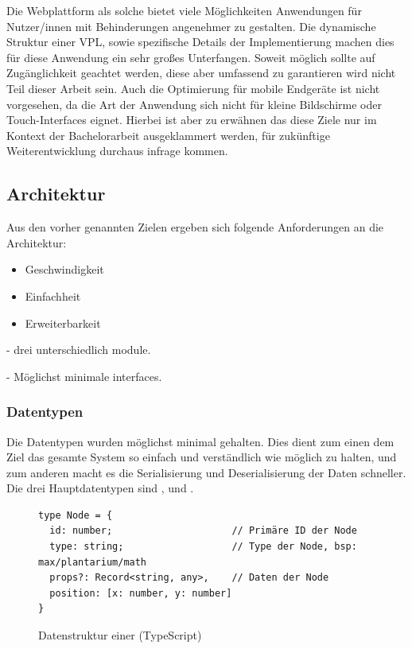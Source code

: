 \documentclass[ngerman]{article}
\begin{document}
Die Webplattform als solche bietet viele Möglichkeiten Anwendungen für Nutzer/innen mit Behinderungen angenehmer zu gestalten. 
Die dynamische Struktur einer VPL, sowie spezifische Details der Implementierung machen dies für diese Anwendung ein sehr großes Unterfangen. 
Soweit möglich sollte auf Zugänglichkeit geachtet werden, diese aber umfassend zu garantieren wird nicht Teil dieser Arbeit sein.
\br
Auch die Optimierung für mobile Endgeräte ist nicht vorgesehen, da die Art der Anwendung sich nicht für kleine Bildschirme oder Touch-Interfaces eignet.
\br
Hierbei ist aber zu erwähnen das diese Ziele nur im Kontext der Bachelorarbeit ausgeklammert werden, für zukünftige Weiterentwicklung durchaus infrage kommen.

\subsection{Architektur}
\label{sec:Architektur}

Aus den vorher genannten Zielen ergeben sich folgende Anforderungen an die Architektur:

\begin{itemize}
  \item Geschwindigkeit
  \item Einfachheit
  \item Erweiterbarkeit
\end{itemize}

- drei unterschiedlich module. 

- Möglichst minimale interfaces. 

\subsubsection{Datentypen}

Die Datentypen wurden möglichst minimal gehalten. Dies dient zum einen dem Ziel das gesamte System so einfach und verständlich wie möglich zu halten, und zum
anderen macht es die Serialisierung und Deserialisierung der Daten schneller.
\br
Die drei Hauptdatentypen sind ,  und . 

\begin{figure}[htbp]
  \begin{code}
    \begin{verbatim}
type Node = {
  id: number;                     // Primäre ID der Node
  type: string;                   // Type der Node, bsp: max/plantarium/math
  props?: Record<string, any>,    // Daten der Node
  position: [x: number, y: number]
}
    \end{verbatim}
  \end{code}

  \caption{Datenstruktur einer  (TypeScript)}
  \label{fig:data_node}

\end{figure}
\end{document}
